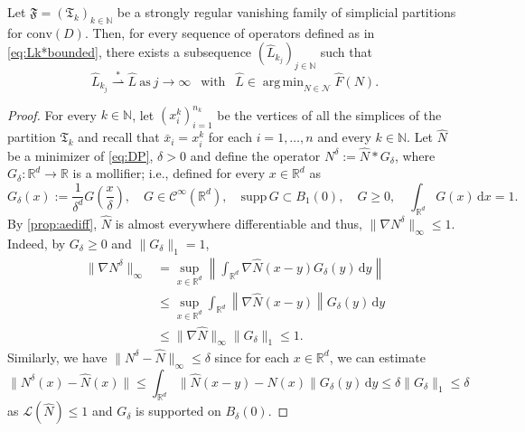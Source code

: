 \documentclass[10pt,a4paper]{amsart}
\DeclareMathOperator*{\argmin}{arg\,min}
\newcommand{\R}{\mathbb{R}}
\newcommand{\weakk}{\stackrel{\ast}{\rightharpoonup}}
\begin{document}
\begin{theorem}\label{thm:density} Let $\mathfrak{F}=(\mathfrak{T}_k)_{k\in \mathbb{N}}$ be a strongly regular vanishing family of simplicial partitions for $\mathrm{conv}(D)$. Then, for every sequence of operators defined as in \cref{eq:Lk*bounded}, there exists a subsequence $(\widehat{L}_{k_j})_{j\in\mathbb{N}}$ such that
\[ \widehat{L}_{k_j}\weakk \widehat{L} \ \text{as} \ j \to \infty \ \ \text{ with } \ \ \widehat{L}\in\argmin_{N\in\mathcal{N}}\widehat{F}(N).\]
\end{theorem}

\begin{proof}
For every $k\in\mathbb{N}$, let $(x_i^k)_{i=1}^{n_k}$ be the vertices of all the simplices of the partition $\mathfrak{T}_k$ and recall that $\bar x_i=x_i^k$ for each $i=1,\ldots, n$ and every $k\in\mathbb{N}$. Let $\widehat{N}$ be a minimizer of \cref{eq:DP}, $\delta > 0$ and define the operator $N^\delta:=\widehat{N}\ast G_\delta$, where $G_\delta:\R^d\to\R$ is a mollifier; i.e., defined for every $x\in\R^d$ as
$$
G_\delta(x):=\frac{1}{\delta^d}G\left(\frac{x}{\delta}\right), \quad G\in \mathcal{C}^\infty(\R^d),\quad \mathrm{supp} \, G\subset B_1(0),\quad G\geq 0, \quad \int_{\R^d} G(x) \, \mathrm{d}x=1.
$$
By \cref{prop:aediff}, $\widehat{N}$ is almost everywhere differentiable and thus, $\|\nabla N^\delta\|_\infty\leq 1$. Indeed, by $G_\delta \geq 0$ and $\| G_\delta \|_1 = 1$,
$$
\begin{aligned}
\|\nabla N^\delta\|_\infty &=\sup_{x\in\R^d} \left\|\int_{\R^d}\nabla \widehat{N}(x-y) G_\delta(y) \, \mathrm{d}y \right\| \\
&\leq \sup_{x\in\R^d}\int_{\R^d} \left\| \nabla \widehat{N}(x-y) \right\| G_\delta(y) \, \mathrm{d}y\\
&\leq \|\nabla \widehat{N}\|_\infty\|G_\delta\|_1\leq 1.
\end{aligned}
$$
Similarly, we have $\|N^\delta - \widehat{N}\|_\infty \leq \delta$ since for each $x \in \mathbb{R}^d$, we can estimate 
\[
\|N^\delta(x) - \widehat{N}(x)\| \leq \int_{\mathbb{R}^d} \|\widehat{N}(x - y) - \widehat{N}(x)\| G_\delta(y) \, \mathrm{d}y
\leq \delta \|G_\delta\|_1 \leq \delta
\]
as $\mathcal{L}(\widehat{N}) \leq 1$ and $G_\delta$ is supported on $B_\delta(0)$.


\end{proof}
\end{document}
